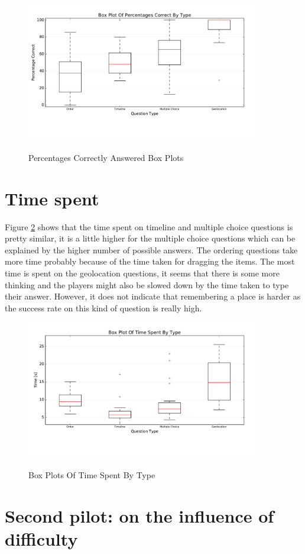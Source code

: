 \begin{figure}
\centering
{\includegraphics[width=4in]{images/pilot_1_boxplot.pdf}}
\caption{Percentages Correctly Answered Box Plots}
\label{fig:p1Boxes}
\end{figure}

\section{Time spent}
Figure \ref{fig:p1BoxesTime} shows that the time spent on timeline and multiple choice questions is pretty similar, it is a little higher for the multiple choice questions which can be explained by the higher number of possible answers. The ordering questions take more time probably because of the time taken for dragging the items. The most time is spent on the geolocation questions, it seems that there is some more thinking and the players might also be slowed down by the time taken to type their answer. However, it does not indicate that remembering a place is harder as the success rate on this kind of question is really high.
\begin{figure}
\centering
{\includegraphics[width=4in]{images/pilot_1_boxplot_time.pdf}}
\caption{Box Plots Of Time Spent By Type}
\label{fig:p1BoxesTime}
\end{figure}

\section{Second pilot: on the influence of difficulty}